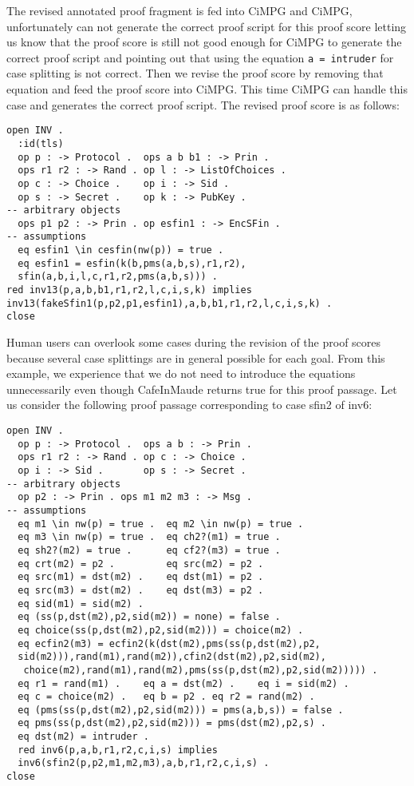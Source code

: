 \documentclass[a4paper,fleqn]{cas-dc}
\begin{document}
The revised annotated proof fragment is fed into CiMPG and CiMPG, unfortunately can not generate the correct proof script for this proof score
letting us know that the proof score is still not good enough for CiMPG to generate the correct proof script and pointing out that using the equation \verb!a = intruder! for case splitting is not correct. Then we revise the proof score by removing that equation and feed the proof score into CiMPG. This time CiMPG can handle this case and generates the correct proof script. The revised proof score is as follows:
\begin{small}
\begin{verbatim}
open INV .
  :id(tls)
  op p : -> Protocol .  ops a b b1 : -> Prin .
  ops r1 r2 : -> Rand . op l : -> ListOfChoices .
  op c : -> Choice .    op i : -> Sid .
  op s : -> Secret .    op k : -> PubKey .
-- arbitrary objects
  ops p1 p2 : -> Prin . op esfin1 : -> EncSFin .
-- assumptions
  eq esfin1 \in cesfin(nw(p)) = true .
  eq esfin1 = esfin(k(b,pms(a,b,s),r1,r2),
  sfin(a,b,i,l,c,r1,r2,pms(a,b,s))) .
red inv13(p,a,b,b1,r1,r2,l,c,i,s,k) implies
inv13(fakeSfin1(p,p2,p1,esfin1),a,b,b1,r1,r2,l,c,i,s,k) .
close
\end{verbatim}
\end{small}
Human users can overlook some cases during the revision of the proof scores because several case splittings are in general possible for each goal. From this example, we experience that we do not need to introduce the equations unnecessarily even though CafeInMaude returns true for this proof passage. 
Let us consider the following proof passage corresponding to case sfin2 of inv6:
\begin{small}
\begin{verbatim}
open INV .
  op p : -> Protocol .  ops a b : -> Prin .
  ops r1 r2 : -> Rand . op c : -> Choice .
  op i : -> Sid .       op s : -> Secret .
-- arbitrary objects
  op p2 : -> Prin . ops m1 m2 m3 : -> Msg .
-- assumptions
  eq m1 \in nw(p) = true .  eq m2 \in nw(p) = true .
  eq m3 \in nw(p) = true .  eq ch2?(m1) = true .
  eq sh2?(m2) = true .      eq cf2?(m3) = true .
  eq crt(m2) = p2 .         eq src(m2) = p2 .
  eq src(m1) = dst(m2) .    eq dst(m1) = p2 .
  eq src(m3) = dst(m2) .    eq dst(m3) = p2 .
  eq sid(m1) = sid(m2) .
  eq (ss(p,dst(m2),p2,sid(m2)) = none) = false .
  eq choice(ss(p,dst(m2),p2,sid(m2))) = choice(m2) .
  eq ecfin2(m3) = ecfin2(k(dst(m2),pms(ss(p,dst(m2),p2,
  sid(m2))),rand(m1),rand(m2)),cfin2(dst(m2),p2,sid(m2),
   choice(m2),rand(m1),rand(m2),pms(ss(p,dst(m2),p2,sid(m2))))) .
  eq r1 = rand(m1) .    eq a = dst(m2) .    eq i = sid(m2) .
  eq c = choice(m2) .   eq b = p2 . eq r2 = rand(m2) .
  eq (pms(ss(p,dst(m2),p2,sid(m2))) = pms(a,b,s)) = false .
  eq pms(ss(p,dst(m2),p2,sid(m2))) = pms(dst(m2),p2,s) .
  eq dst(m2) = intruder .
  red inv6(p,a,b,r1,r2,c,i,s) implies
  inv6(sfin2(p,p2,m1,m2,m3),a,b,r1,r2,c,i,s) .
close
\end{verbatim}
\end{small}
\end{document}
